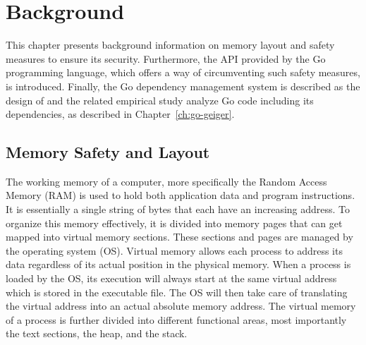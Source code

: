 
\chapter{Background}\label{ch:background}

This chapter presents background information on memory layout and safety measures to ensure its security.
Furthermore, the \unsafe{} \acrshort{API} provided by the Go programming language, which offers a way of circumventing
such safety measures, is introduced.
Finally, the Go dependency management system is described as the design of \toolGeiger{} and the related empirical study
analyze Go code including its dependencies, as described in Chapter~\ref{ch:go-geiger}.



\section{Memory Safety and Layout}\label{sec:background:memory-safety-layout}

The working memory of a computer, more specifically the Random Access Memory (\acrshort{RAM}) is used to hold both
application data and program instructions.
It is essentially a single string of bytes that each have an increasing address.
To organize this memory effectively, it is divided into memory pages that can get mapped into virtual memory sections.
These sections and pages are managed by the operating system (\acrshort{OS}).
Virtual memory allows each process to address its data regardless of its actual position in the physical memory.
When a process is loaded by the \acrshort{OS}, its execution will always start at the same virtual address which is
stored in the executable file.
The \acrshort{OS} will then take care of translating the virtual address into an actual absolute memory address.
The virtual memory of a process is further divided into different functional areas, most importantly the text sections,
the heap, and the stack.

